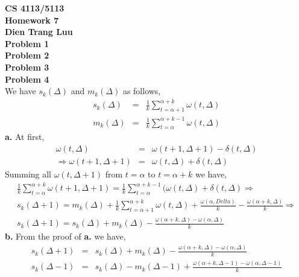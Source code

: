 


\noindent
{\bf
CS 4113/5113\\
Homework 7\\
Dien Trang Luu}\\

\noindent
{\bf Problem 1}\\

\noindent
{\bf Problem 2}\\

\noindent
{\bf Problem 3}\\

\noindent
{\bf Problem 4}\\

We have $s_k(\Delta)$ and $m_k(\Delta)$ as follows,\\
\begin{eqnarray*}
s_k(\Delta) &=& \frac{1}{k}\sum_{t=\alpha+1}^{\alpha+k}\omega(t,\Delta) \\
m_k(\Delta) &=& \frac{1}{k}\sum_{t=\alpha}^{\alpha+k-1}\omega(t,\Delta)
\end{eqnarray*}
{\bf a.} At first,\\
\begin{eqnarray*}
  \omega(t,\Delta) &=& \omega(t+1,\Delta+1) - \delta(t,\Delta) \\
  \Rightarrow \omega(t+1,\Delta+1) &=& \omega(t,\Delta) + \delta(t,\Delta)
\end{eqnarray*}
Summing all $\omega(t, \Delta+1)$ from $t=\alpha$ to $t=\alpha+k$ we have, \\
\begin{eqnarray*}
  \frac{1}{k}\sum_{t=\alpha}^{\alpha+k}\omega(t+1,\Delta+1) = \frac{1}{k}
  \sum_{t=\alpha}^{\alpha+k-1}(\omega(t,\Delta) + \delta(t,\Delta) \Rightarrow \\
  s_k(\Delta+1) = m_k(\Delta) + \frac{1}{k}\sum_{t=\alpha+1}^{\alpha+k}
  \omega(t,\Delta) + \frac{\omega(\alpha, Delta)}{k} - \frac{\omega(\alpha+k,\Delta)}{k} \Rightarrow\\
  s_k(\Delta+1) = s_k(\Delta) + m_k(\Delta) - \frac{\omega(\alpha+k,\Delta)
  -\omega(\alpha, \Delta)}{k}
\end{eqnarray*}
{\bf b.} From the proof of {\bf a.} we have,\\
\begin{eqnarray*}
  s_k(\Delta+1) &=& s_k(\Delta) + m_k(\Delta) - \frac{\omega(\alpha+k,\Delta)
  -\omega(\alpha, \Delta)}{k} \\
  s_k(\Delta-1) &=& s_k(\Delta) - m_k(\Delta-1) + \frac{\omega(\alpha+k,\Delta
  -1) -\omega(\alpha, \Delta-1)}{k}
\end{eqnarray*}
